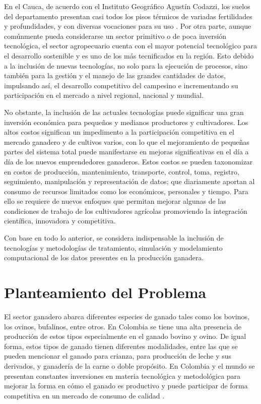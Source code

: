 En el Cauca, de acuerdo con el Instituto Geográfico Agustín Codazzi, los suelos del departamento presentan casi todos los pisos térmicos de variadas fertilidades y profundidades, y con diversas vocaciones para su uso \cite{igac}. Por otra parte, aunque comúnmente pueda considerarse un sector primitivo o de poca inversión tecnológica, el sector agropecuario cuenta con el mayor potencial tecnológico para el desarrollo sostenible y es uno de los más tecnificados en la región. Esto debido a la inclusión de nuevas tecnologías, no solo para la ejecución de procesos, sino también para la gestión y el manejo de las grandes cantidades de datos, impulsando así, el desarrollo competitivo del campesino e incrementando su participación en el mercado a nivel regional, nacional y mundial.

No obstante, la inclusión de las actuales tecnologías puede significar una gran inversión económica para pequeños y medianos productores y cultivadores. Los altos costos significan un impedimento a la participación competitiva en el mercado ganadero y de cultivos varios, con lo que el mejoramiento de pequeñas partes del sistema total puede manifestarse en mejoras significativas en el día a día de los nuevos emprendedores ganaderos. Estos costos se pueden taxonomizar en costos de producción, mantenimiento, transporte, control, toma, registro, seguimiento, manipulación y representación de datos; que diariamente aportan al consumo de recursos limitados como los económicos, personales y tiempo. Para ello se requiere de nuevos enfoques que permitan mejorar algunas de las condiciones de trabajo de los cultivadores agrícolas promoviendo la integración científica, innovadora y competitiva.

Con base en todo lo anterior, se considera indispensable la inclusión de tecnologías y metodologías de tratamiento, simulación y modelamiento computacional de los datos presentes en la producción ganadera.


\section{Planteamiento del Problema}

El sector ganadero abarca diferentes especies de ganado tales como los bovinos, los ovinos, bufalinos, entre otros. En Colombia se tiene una alta presencia de producción de estos tipos especialmente en el ganado bovino y ovino. De igual forma, estos tipos de ganado tienen diferentes modalidades, entre las que se pueden mencionar el ganado para crianza, para producción de leche y sus derivados, y ganadería de la carne o doble propósito. En Colombia y el mundo se presentan constantes inversiones en materia tecnológica y metodológica para mejorar la forma en cómo el ganado es productivo y puede participar de forma competitiva en un mercado de consumo de calidad \cite{fao}.

